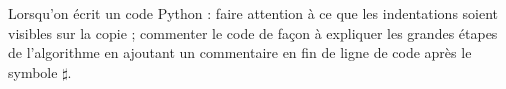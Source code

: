 \documentclass[a4paper,12pt]{article}
\begin{document}

 \begin{center}
  \begin{large}
  \end{large}
 \end{center}

\begin{boxedminipage}{\textwidth} 
Lorsqu'on écrit un code Python : faire attention à ce que les indentations soient visibles sur la copie ; commenter le code de façon à expliquer les grandes étapes de l'algorithme en ajoutant un commentaire en fin de ligne de code après le symbole $\sharp$.
\end{boxedminipage}
 
\end{document}

